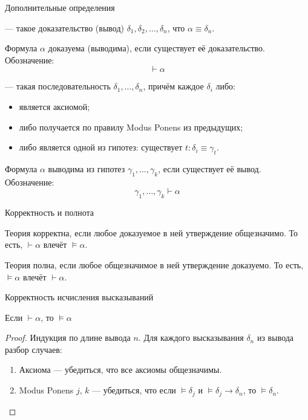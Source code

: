 \documentclass[handout]{beamer}
\begin{document}
\begin{frame}{Дополнительные определения}

\begin{defrus} 
--- такое доказательство (вывод) $\delta_1, \delta_2, \dots, \delta_n$,
что $\alpha\equiv\delta_n$.

Формула $\alpha$ доказуема (выводима), если существует её доказательство. Обозначение:
$$\vdash \alpha$$\end{defrus}\pause

\begin{defrus}
--- такая последовательность
$\delta_1,\dots,\delta_n$, причём каждое $\delta_i$ либо:
\begin{itemize}
\item является аксиомой;
\item либо получается по правилу Modus Ponens из предыдущих;
\item либо является одной из гипотез: существует $t: \delta_i \equiv \gamma_t$.
\end{itemize}

Формула $\alpha$ выводима из гипотез $\gamma_1,\dots,\gamma_k$, если существует её вывод. Обозначение:
$$\gamma_1,\dots,\gamma_k\vdash\alpha$$\end{defrus}

\end{frame}

\begin{frame}{Корректность и полнота}
\begin{defrus}
Теория корректна, если любое доказуемое в ней утверждение общезначимо.
То есть, $\vdash\alpha$ влечёт $\models\alpha$.
\end{defrus}

\begin{defrus}
Теория полна, если любое общезначимое в ней утверждение доказуемо.
То есть, $\models\alpha$ влечёт $\vdash\alpha$.
\end{defrus}
\end{frame}

\begin{frame}{Корректность исчисления высказываний}
\begin{thmrus}[корректность]
Если $\vdash\alpha$, то $\models\alpha$
\end{thmrus}

\begin{proof}
Индукция по длине вывода $n$.
Для каждого высказывания $\delta_n$ из вывода разбор случаев:
\begin{enumerate}
\item Аксиома --- убедиться, что все аксиомы общезначимы.
\item Modus Ponens $j$, $k$ --- убедиться, что если $\models\delta_j$ и 
$\models\delta_j\rightarrow\delta_n$, то $\models\delta_n$.
\end{enumerate}
\end{proof}
\end{frame}
\end{document}
